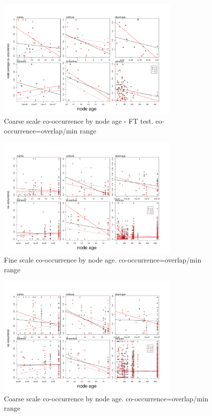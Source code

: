 \documentclass[12pt,letterpaper]{article}
\begin{document}
\begin{figure}[h!]
\centering
\caption{Coarse scale co-occurrence by node age - FT test. co-occurrence=overlap/min range}
\includegraphics[width=0.8\textwidth]{overlap_age_FT_5_fig}
\end{figure}

\begin{figure}[h!]
 \caption{Fine scale co-occurrence by node age. co-occurrence=overlap/min range}
 \centering
 \includegraphics[width=0.8\textwidth]{overlap_age_008_fig}
\end{figure}

\begin{figure}[h!]
\centering
\caption{Coarse scale co-occurrence by node age. co-occurrence=overlap/min range}
\includegraphics[width=0.8\textwidth]{overlap_age_5_fig}
\end{figure}
\end{document}
